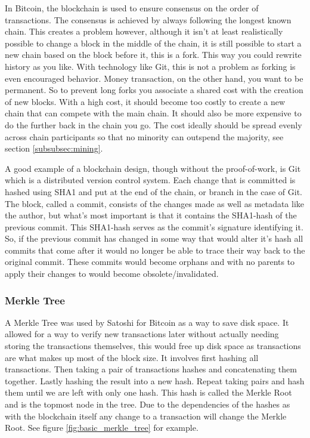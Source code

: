 \documentclass[12pt]{article}
\begin{document}
In Bitcoin, the blockchain is used to ensure consensus on the order of transactions. The consensus is achieved by always following the longest known chain. This creates a problem however, although it isn't at least realistically possible to change a block in the middle of the chain, it is still possible to start a new chain based on the block before it, this is a fork. This way you could rewrite history as you like. With technology like Git, this is not a problem as forking is even encouraged behavior. Money transaction, on the other hand, you want to be permanent. So to prevent long forks you associate a shared cost with the creation of new blocks. With a high cost, it should become too costly to create a new chain that can compete with the main chain. It should also be more expensive to do the further back in the chain you go. The cost ideally should be spread evenly across chain participants so that no minority can outspend the majority, see section \ref{subsubsec:mining}.

A good example of a blockchain design, though without the proof-of-work, is Git which is a distributed version control system. Each change that is committed is hashed using SHA1 and put at the end of the chain, or branch in the case of Git. The block, called a commit, consists of the changes made as well as metadata like the author, but what's most important is that it contains the SHA1-hash of the previous commit. This SHA1-hash serves as the commit's signature identifying it. So, if the previous commit has changed in some way that would alter it's hash all commits that come after it would no longer be able to trace their way back to the original commit. These commits would become orphans and with no parents to apply their changes to would become obsolete/invalidated.

\subsubsection{Merkle Tree}\label{subsubsec:merkle_tree}

A Merkle Tree was used by Satoshi for Bitcoin as a way to save disk space. It allowed for a way to verify new transactions later without actually needing storing the transactions themselves, this would free up disk space as transactions are what makes up most of the block size. It involves first hashing all transactions. Then taking a pair of transactions hashes and concatenating them together. Lastly hashing the result into a new hash. Repeat taking pairs and hash them until we are left with only one hash. This hash is called the Merkle Root and is the topmost node in the tree. Due to the dependencies of the hashes as with the blockchain itself any change to a transaction will change the Merkle Root. See figure \ref{fig:basic_merkle_tree} for example.
\end{document}
